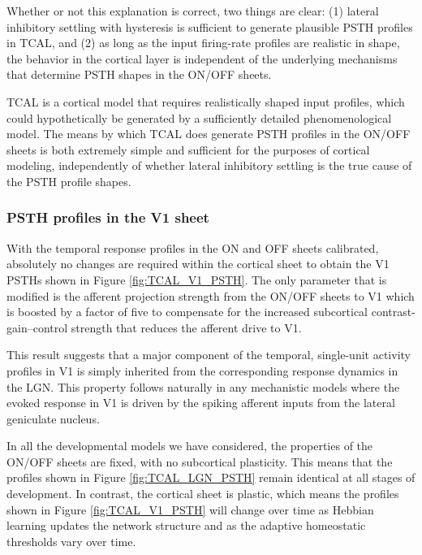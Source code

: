 \documentclass[phd,ianc,twoside]{infthesis}
\begin{document}
Whether or not this explanation is correct, two things are clear: (1)
lateral inhibitory settling with hysteresis is sufficient to generate
plausible PSTH profiles in TCAL, and (2) as long as the input firing-rate
profiles are realistic in shape, the behavior in the cortical layer is
independent of the underlying mechanisms that determine PSTH shapes in
the ON/OFF sheets.

TCAL is a cortical model that requires realistically shaped input
profiles, which could hypothetically be generated by a sufficiently
detailed phenomenological model. The means by which TCAL does generate
PSTH profiles in the ON/OFF sheets is both extremely simple and
sufficient for the purposes of cortical modeling, independently of
whether lateral inhibitory settling is the true cause of the PSTH
profile shapes.


\subsubsection*{PSTH profiles in the V1 sheet}

With the temporal response profiles in the ON and OFF sheets calibrated,
absolutely no changes are required within the cortical sheet to obtain
the V1 PSTHs shown in Figure \ref{fig:TCAL_V1_PSTH}. The only parameter
that is modified is the afferent projection strength from the ON/OFF
sheets to V1 which is boosted by a factor of five to compensate for the
increased subcortical contrast-gain--control strength that reduces the
afferent drive to V1.

This result suggests that a major component of the temporal, single-unit
activity profiles in V1 is simply inherited from the corresponding
response dynamics in the LGN. This property follows naturally in any
mechanistic models where the evoked response in V1 is driven by the
spiking afferent inputs from the lateral geniculate nucleus.

In all the developmental models we have considered, the properties of
the ON/OFF sheets are fixed, with no subcortical plasticity. This
means that the profiles shown in Figure \ref{fig:TCAL_LGN_PSTH} remain
identical at all stages of development. In contrast, the cortical sheet
is plastic, which means the profiles shown in Figure
\ref{fig:TCAL_V1_PSTH} will change over time as Hebbian learning updates
the network structure and as the adaptive homeostatic thresholds vary
over time.
\end{document}
